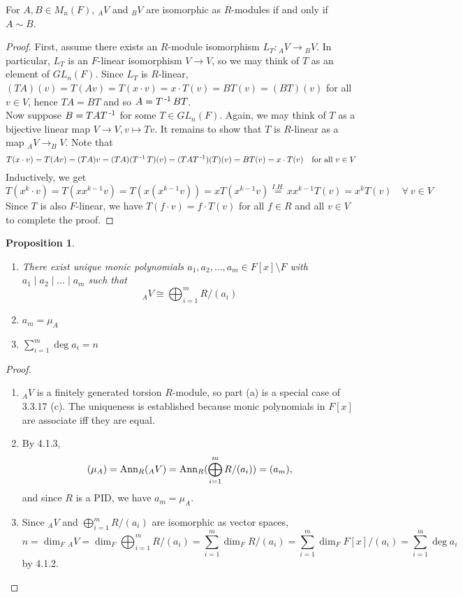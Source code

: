 \documentclass[11pt]{book}
\newcounter{counter}
\newtheorem{proposition}[counter]{Proposition}   \newtheorem{problem}[counter]{Problem}   \newtheorem*{proposition*}{Proposition}   \newtheorem*{lemma*}{Lemma}
\theoremstyle{definition}   \newtheorem{defn}[counter]{Definition} %
\newcommand{\bs}{\setminus}   \newcommand{\A}{\mathcal{A}}   \newcommand{\sy}{\textnormal{Syl}}   \newcommand{\size}[1]{\left| #1 \right|}
\newcommand{\ann}[2]{\textnormal{Ann}_{#1}(#2)}   \newcommand{\rk}{\textnormal{rk}}
\DeclareMathOperator{\ra}{\rightarrow}   \DeclareMathOperator{\Poly}{\mathbf{P}}   \DeclareMathOperator{\spn}{\textnormal{span}}   \DeclareMathOperator{\aut}{\textnormal{Aut}}
\newcommand{\vs}{\vspace{8pt}}
\numberwithin{counter}{chapter}
\begin{document}
\vs

\begin{lemma}
For $A,B \in M_n(F)$, $_AV$ and $_BV$ are isomorphic as $R$-modules if and only if $A \sim B$.
\end{lemma}

\begin{proof}
First, assume there exists an $R$-module isomorphism $L_T : {_AV} \ra {_BV}$. In particular, $L_T$ is an $F$-linear isomorphism $V \ra V$, so we may think of $T$ as an element of $GL_n(F)$. Since $L_T$ is $R$-linear, \\ $(TA)(v) = T(Av) = T(x \cdot v) = x \cdot T(v) = B T(v) = (BT)(v)$ for all $v \in V$, hence $TA = BT$ and so $A = T\operatorname{^{-1}} BT$. \\

Now suppose $B = TAT\operatorname{^{-1}}$ for some $T \in GL_n(F)$. Again, we may think of $T$ as a bijective linear map $V \ra V, v \mapsto Tv$. It remains to show that $T$ is $R$-linear as a map $_AV \ra _BV$. Note that
	\[T(x \cdot v) = T(Av) = (TA)v = (TA)(T\operatorname{^{-1}} T)(v) = (TAT\operatorname{^{-1}})(T)(v) = BT(v) = x \cdot T(v) \quad \textnormal{for all } v \in V \]
Inductively, we get
	\[T(x^k \cdot v) = T(x x^{k-1}v) = T(x (x^{k-1}v)) = xT(x^{k-1}v) \overset{I. H.}{=} xx^{k-1}T(v) = x^k T(v)  \quad \forall \ v \in V \]
Since $T$ is also $F$-linear, we have $T(f \cdot v) = f \cdot T(v)$ for all $f \in R$ and all $v \in V$ to complete the proof.
\end{proof}

\newpage

\begin{proposition}\
\begin{enumerate}
\item[(a)] There exist unique monic polynomials $a_1,a_2,\dots,a_m \in F[x]\bs F$ with $a_1 \mid a_2 \mid \dots \mid a_m$ such that
	\[_AV \cong \bigoplus_{i=1}^m R/(a_i) \]
\item[(b)] $a_m = \mu_A$
\item[(c)] $\sum_{i=1}^m \deg a_i = n$
\end{enumerate}
\end{proposition}

\begin{proof}\
\begin{enumerate}
\item[(a)] $_AV$ is a finitely generated torsion $R$-module, so part (a) is a special case of 3.3.17 (c). The uniqueness is established because monic polynomials in $F[x]$ are associate iff they are equal.
\item[(b)] By 4.1.3, $$(\mu_A) = \ann{R}{_AV} = \ann{R}{\bigoplus_{i=1}^m R/(a_i)} = (a_m),$$ and since $R$ is a PID, we have $a_m = \mu_A$.
\item[(c)] Since $_AV$ and $\bigoplus_{i=1}^m R/(a_i)$ are isomorphic as vector spaces,
	\[n = \dim_F {_AV} = \dim_F \bigoplus_{i=1}^m R/(a_i) = \sum_{i=1}^m \dim_F R/(a_i) = \sum_{i=1}^m \dim_F F[x]/(a_i) = \sum_{i=1}^m \deg a_i \]
by 4.1.2.
\end{enumerate}
\end{proof}
\end{document}

